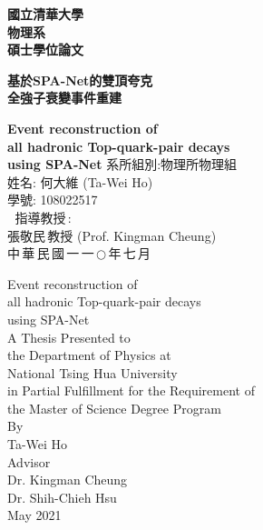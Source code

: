 \begin{titlepage}  %
\begin{center}
\Huge
\textbf{國立清華大學\\物理系\\碩士學位論文\\}
\vspace*{1.5in}
\huge
	
\textbf{基於SPA-Net的雙頂夸克\\全強子衰變事件重建}
	
\LARGE
\textbf{Event reconstruction of \\ all hadronic Top-quark-pair decays\\ using SPA-Net}
\vfill
\Large 系所組別:物理所物理組\\
\Large 姓名:  何大維 (Ta-Wei Ho)\\
\Large 學號:  108022517  \\
\Large $\:$$\:$$\,$指導教授$\,$: \\張敬民$\,$教授 (Prof. Kingman Cheung)\\ 
\vfill
\Large 中$\,$華$\,$民$\,$國$\,$一$\,$一$\,$$\bigcirc$$\,$年$\,$七$\,$月
\end{center}
\end{titlepage}

\begin{titlepage} %
\begin{center}
\huge {Event reconstruction of\\ all hadronic Top-quark-pair decays\\ using SPA-Net\\}
\vspace*{1.5in}
\large A Thesis Presented to \\the Department of Physics at \\National Tsing Hua University \\in Partial Fulfillment for the Requirement of \\the Master of Science Degree Program\\
\vspace*{2in}
\large By\\Ta-Wei Ho\\
\large Advisor\\Dr. Kingman Cheung\\ Dr. Shih-Chieh Hsu \\
\large May 2021
\end{center}
\end{titlepage}
